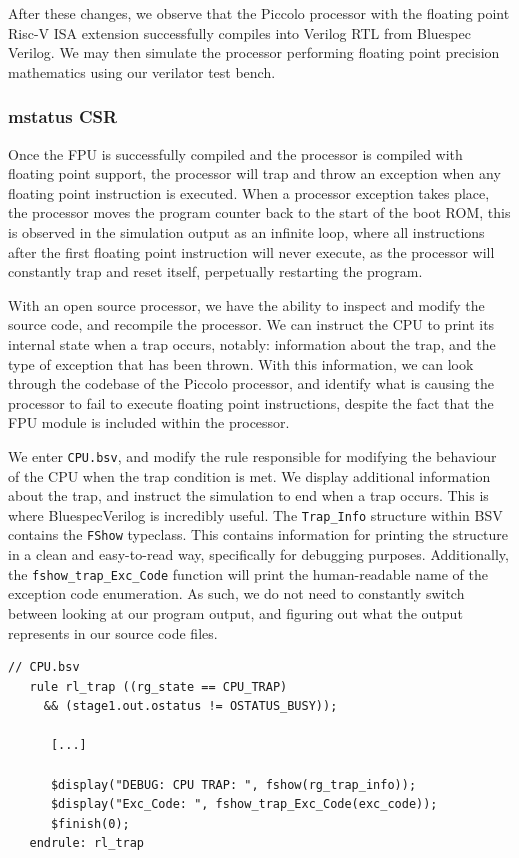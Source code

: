 \documentclass[a4paper,8pt]{report}
\begin{document}
After these changes, we observe that the Piccolo processor with the
floating point Risc-V ISA extension successfully compiles into Verilog RTL from
Bluespec Verilog. We may then simulate the processor performing floating point
precision mathematics using our verilator test bench.

\subsubsection{mstatus CSR}
Once the FPU is successfully compiled and the processor is compiled with
floating point support, the processor will trap and throw an exception when any
floating point instruction is executed. When a processor exception takes place,
the processor moves the program counter back to the start of the boot ROM, this
is observed in the simulation output as an infinite loop, where all instructions
after the first floating point instruction will never execute, as the processor
will constantly trap and reset itself, perpetually restarting the program.

With an open source processor, we have the ability to inspect and modify the
source code, and recompile the processor. We can instruct the CPU to print its
internal state when a trap occurs, notably: information about the trap, and the
type of exception that has been thrown. With this information, we can look
through the codebase of the Piccolo processor, and identify what is causing the
processor to fail to execute floating point instructions, despite the fact that
the FPU module is included within the processor.

We enter \texttt{CPU.bsv}, and modify the rule responsible for modifying the
behaviour of the CPU when the trap condition is met. We display additional
information about the trap, and instruct the simulation to end when a trap
occurs. This is where BluespecVerilog is incredibly useful. The
\texttt{Trap\_Info} structure within BSV contains the \texttt{FShow} typeclass.
This contains information for printing the structure in a clean and easy-to-read
way, specifically for debugging purposes. Additionally, the
\texttt{fshow\_trap\_Exc\_Code} function will print the human-readable name of
the exception code enumeration. As such, we do not need to constantly switch
between looking at our program output, and figuring out what the output
represents in our source code files.

\begin{verbatim}
// CPU.bsv
   rule rl_trap ((rg_state == CPU_TRAP)
     && (stage1.out.ostatus != OSTATUS_BUSY));

      [...]

      $display("DEBUG: CPU TRAP: ", fshow(rg_trap_info));
      $display("Exc_Code: ", fshow_trap_Exc_Code(exc_code));
      $finish(0);
   endrule: rl_trap
\end{verbatim}
\end{document}

